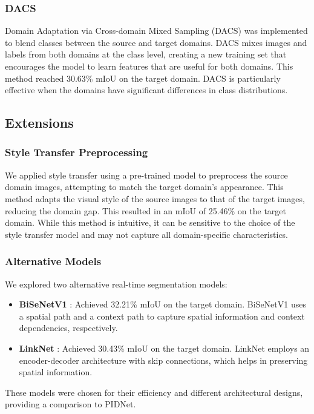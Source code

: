 \documentclass{article}
\begin{document}
\begin{multicols}{2}
		\subsubsection{DACS}
		Domain Adaptation via Cross-domain Mixed Sampling (DACS) \cite{tranheden2021dacs} was implemented to blend classes between the source and target domains. DACS mixes images and labels from both domains at the class level, creating a new training set that encourages the model to learn features that are useful for both domains. This method reached 30.63\% mIoU on the target domain. DACS is particularly effective when the domains have significant differences in class distributions.
		
		\subsection{Extensions}
		\subsubsection{Style Transfer Preprocessing}
		We applied style transfer using a pre-trained model to preprocess the source domain images, attempting to match the target domain's appearance. This method adapts the visual style of the source images to that of the target images, reducing the domain gap. This resulted in an mIoU of 25.46\% on the target domain. While this method is intuitive, it can be sensitive to the choice of the style transfer model and may not capture all domain-specific characteristics.
		
		\subsubsection{Alternative Models}
		We explored two alternative real-time segmentation models:
		\begin{itemize}
			\item \textbf{BiSeNetV1} \cite{yu2018bisenet}: Achieved 32.21\% mIoU on the target domain. BiSeNetV1 uses a spatial path and a context path to capture spatial information and context dependencies, respectively.
			\item \textbf{LinkNet} \cite{chaurasia2017linknet}: Achieved 30.43\% mIoU on the target domain. LinkNet employs an encoder-decoder architecture with skip connections, which helps in preserving spatial information.
		\end{itemize}
		These models were chosen for their efficiency and different architectural designs, providing a comparison to PIDNet.
		

\end{multicols}
\end{document}
